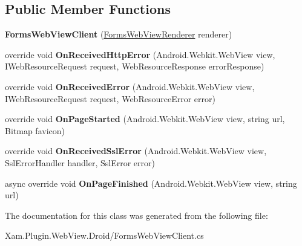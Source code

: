 \subsection*{Public Member Functions}
\begin{DoxyCompactItemize}
\item 
\mbox{\label{class_xam_1_1_plugin_1_1_web_view_1_1_droid_1_1_forms_web_view_client_a5f1e4444398e80c8176e050fa576bd9c}} 
{\bfseries Forms\+Web\+View\+Client} (\hyperlink{class_xam_1_1_plugin_1_1_web_view_1_1_droid_1_1_forms_web_view_renderer}{Forms\+Web\+View\+Renderer} renderer)
\item 
\mbox{\label{class_xam_1_1_plugin_1_1_web_view_1_1_droid_1_1_forms_web_view_client_a3a0bf957e632e009cd68db23d3faddfc}} 
override void {\bfseries On\+Received\+Http\+Error} (Android.\+Webkit.\+Web\+View view, I\+Web\+Resource\+Request request, Web\+Resource\+Response error\+Response)
\item 
\mbox{\label{class_xam_1_1_plugin_1_1_web_view_1_1_droid_1_1_forms_web_view_client_ab3fd28f5d160ac446e6464553954b2af}} 
override void {\bfseries On\+Received\+Error} (Android.\+Webkit.\+Web\+View view, I\+Web\+Resource\+Request request, Web\+Resource\+Error error)
\item 
\mbox{\label{class_xam_1_1_plugin_1_1_web_view_1_1_droid_1_1_forms_web_view_client_a9e22f7044efe5bf4d3dd59778a6e294d}} 
override void {\bfseries On\+Page\+Started} (Android.\+Webkit.\+Web\+View view, string url, Bitmap favicon)
\item 
\mbox{\label{class_xam_1_1_plugin_1_1_web_view_1_1_droid_1_1_forms_web_view_client_afcf54bb574fdd7599fd53d87ddcc4fa9}} 
override void {\bfseries On\+Received\+Ssl\+Error} (Android.\+Webkit.\+Web\+View view, Ssl\+Error\+Handler handler, Ssl\+Error error)
\item 
\mbox{\label{class_xam_1_1_plugin_1_1_web_view_1_1_droid_1_1_forms_web_view_client_a039e17de34fe088c363678665ca4862e}} 
async override void {\bfseries On\+Page\+Finished} (Android.\+Webkit.\+Web\+View view, string url)
\end{DoxyCompactItemize}


The documentation for this class was generated from the following file\+:\begin{DoxyCompactItemize}
\item 
Xam.\+Plugin.\+Web\+View.\+Droid/Forms\+Web\+View\+Client.\+cs\end{DoxyCompactItemize}
